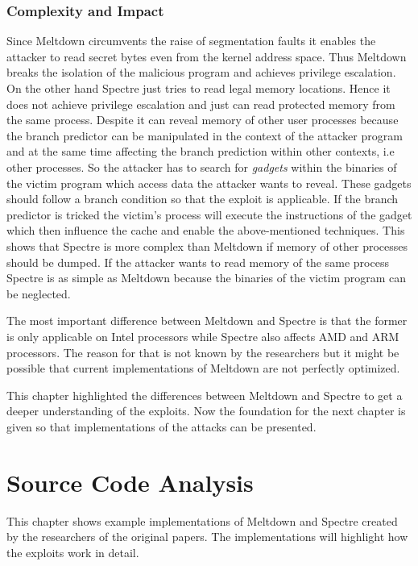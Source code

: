 \documentclass[a4paper,oneside,openright] {scrreprt}
\begin{document}
\subsection{Complexity and Impact}
\label{ch:intro:motivation:A}

Since Meltdown circumvents the raise of segmentation faults it enables the attacker to read secret bytes even from the kernel address space.
Thus Meltdown breaks the isolation of the malicious program and achieves privilege escalation. 
On the other hand Spectre just tries to read legal memory locations. Hence it does not achieve privilege escalation and just can read
protected memory from the same process. 
Despite it can reveal memory of other user processes because the branch predictor can be manipulated in the 
context of the attacker program and at the same time affecting the branch prediction within other contexts, i.e other processes.
So the attacker has to search for \textit{gadgets} within the binaries of the victim program which access data the attacker wants to reveal.
These gadgets should follow a branch condition so that the exploit is applicable.
If the branch predictor is tricked the victim's process will execute the instructions of the gadget which then influence the cache 
and enable the above-mentioned techniques. 
This shows that Spectre is more complex than Meltdown if memory of other processes should be dumped. 
If the attacker wants to read memory of the same process Spectre is as simple as Meltdown because the binaries of the victim program
can be neglected.

The most important difference between Meltdown and Spectre is that the former is only applicable on Intel processors while Spectre 
also affects AMD and ARM processors. The reason for that is not known by the researchers but it might be possible that current 
implementations of Meltdown are not perfectly optimized.

This chapter highlighted the differences between Meltdown and Spectre to get a deeper understanding of the exploits.
Now the foundation for the next chapter is given so that implementations of the attacks can be presented.

\chapter{Source Code Analysis}
\label{ch:sourceCodeAnalysis}

This chapter shows example implementations of Meltdown and Spectre created by the researchers of the original papers.
The implementations will highlight how the exploits work in detail.
\end{document}
